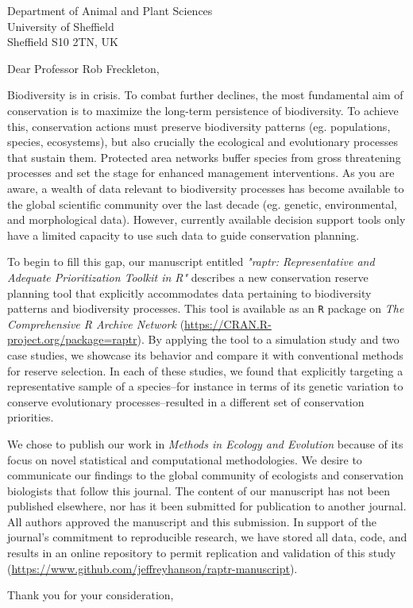\documentclass{letter}
\begin{document}
\begin{letter}{Department of Animal and Plant Sciences\\University of Sheffield\\Sheffield S10 2TN, UK}
\opening{Dear Professor Rob Freckleton,}

Biodiversity is in crisis. To combat further declines, the most fundamental aim of conservation is to maximize the long-term persistence of biodiversity. To achieve this, conservation actions must preserve biodiversity patterns (eg. populations, species, ecosystems), but also crucially the ecological and evolutionary processes that sustain them. Protected area networks buffer species from gross threatening processes and set the stage for enhanced management interventions. As you are aware, a wealth of data relevant to biodiversity processes has become available to the global scientific community over the last decade (eg. genetic, environmental, and morphological data). However, currently available decision support tools only have a limited capacity to use such data to guide conservation planning.

To begin to fill this gap, our manuscript entitled \textit{"raptr: Representative and Adequate Prioritization Toolkit in R"} describes a new conservation reserve planning tool that explicitly accommodates data pertaining to biodiversity patterns and biodiversity processes. This tool is available as an \texttt{R} package on \textit{The Comprehensive R Archive Network} (\url{https://CRAN.R-project.org/package=raptr}). By applying the tool to a simulation study and two case studies, we showcase its behavior and compare it with conventional methods for reserve selection. In each of these studies, we found that explicitly targeting a representative sample of a species--for instance in terms of its genetic variation to conserve evolutionary processes--resulted in a different set of conservation priorities.

We chose to publish our work in \textit{Methods in Ecology and Evolution} because of its focus on novel statistical and computational methodologies. We desire to communicate our findings to the global community of ecologists and conservation biologists that follow this journal. The content of our manuscript has not been published elsewhere, nor has it been submitted for publication to another journal. All authors approved the manuscript and this submission. In support of the journal's commitment to reproducible research, we have stored all data, code, and results in an online repository to permit replication and validation of this study (\url{https://www.github.com/jeffreyhanson/raptr-manuscript}). 

\closing{Thank you for your consideration,}

\end{letter}
\end{document}
